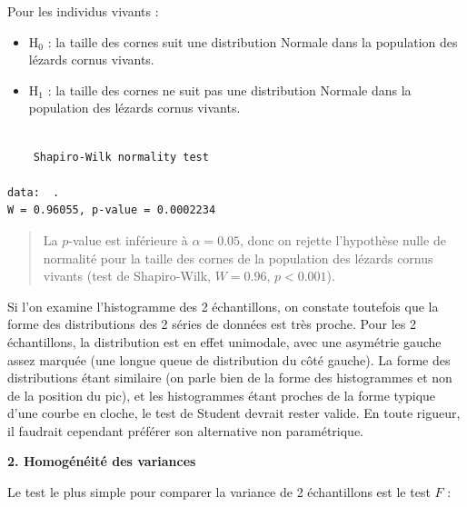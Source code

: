 \documentclass[a4paperpaper,]{article}
\newenvironment{Shaded}{\begin{snugshade}}{\end{snugshade}}
\newcommand{\KeywordTok}[1]{\textcolor[rgb]{0.12,0.11,0.11}{\textbf{#1}}}
\newcommand{\NormalTok}[1]{\textcolor[rgb]{0.12,0.11,0.11}{#1}}
\newcommand{\OperatorTok}[1]{\textcolor[rgb]{0.12,0.11,0.11}{#1}}
\newcommand{\StringTok}[1]{\textcolor[rgb]{0.75,0.01,0.01}{#1}}
\providecommand{\tightlist}{%
  \setlength{\itemsep}{0pt}\setlength{\parskip}{0pt}}
\begin{document}
Pour les individus vivants :

\begin{itemize}
\tightlist
\item
  H\(_0\) : la taille des cornes suit une distribution Normale dans la population des lézards cornus vivants.
\item
  H\(_1\) : la taille des cornes ne suit pas une distribution Normale dans la population des lézards cornus vivants.
\end{itemize}

\begin{Shaded}
\end{Shaded}

\begin{verbatim}

    Shapiro-Wilk normality test

data:  .
W = 0.96055, p-value = 0.0002234
\end{verbatim}

\begin{quote}
La \(p\)-value est inférieure à \(\alpha = 0.05\), donc on rejette l'hypothèse nulle de normalité pour la taille des cornes de la population des lézards cornus vivants (test de Shapiro-Wilk, \(W = 0.96\), \(p < 0.001\)).
\end{quote}

Si l'on examine l'histogramme des 2 échantillons, on constate toutefois que la forme des distributions des 2 séries de données est très proche. Pour les 2 échantillons, la distribution est en effet unimodale, avec une asymétrie gauche assez marquée (une longue queue de distribution du côté gauche). La forme des distributions étant similaire (on parle bien de la forme des histogrammes et non de la position du pic), et les histogrammes étant proches de la forme typique d'une courbe en cloche, le test de Student devrait rester valide. En toute rigueur, il faudrait cependant préférer son alternative non paramétrique.

\textbf{2. Homogénéité des variances}

Le test le plus simple pour comparer la variance de 2 échantillons est le test \(F\) :
\end{document}
